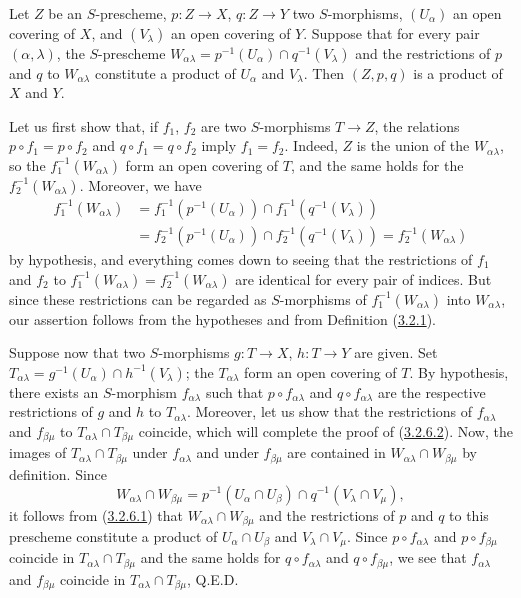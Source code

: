 \begin{lemma}[3.2.6.2]
\label{I.3.2.6.2}
Let $Z$ be an $S$-prescheme, $p:Z\to X$, $q:Z\to Y$ two $S$-morphisms,
$(U_\alpha)$ an open covering of $X$, and $(V_\lambda)$ an open covering
of $Y$. Suppose that for every pair $(\alpha,\lambda)$, the
$S$-prescheme
$W_{\alpha\lambda}=p^{-1}(U_\alpha)\cap q^{-1}(V_\lambda)$ and the
restrictions of $p$ and $q$ to $W_{\alpha\lambda}$ constitute a product of
$U_\alpha$ and $V_\lambda$. Then $(Z,p,q)$ is a product of $X$ and $Y$.
\end{lemma}

Let us first show that, if $f_1$, $f_2$ are two $S$-morphisms $T\to Z$, the
relations $p\circ f_1=p\circ f_2$ and $q\circ f_1=q\circ f_2$ imply
$f_1=f_2$. Indeed, $Z$ is the union of the $W_{\alpha\lambda}$, so the
$f_1^{-1}(W_{\alpha\lambda})$ form an open covering of $T$, and
the same holds for the $f_2^{-1}(W_{\alpha\lambda})$. Moreover, we have
\[
\begin{aligned}
  f_1^{-1}(W_{\alpha\lambda})
  &=f_1^{-1}(p^{-1}(U_\alpha))\cap
    f_1^{-1}(q^{-1}(V_\lambda)) \\
  &=f_2^{-1}(p^{-1}(U_\alpha))\cap
    f_2^{-1}(q^{-1}(V_\lambda))
   =f_2^{-1}(W_{\alpha\lambda})
\end{aligned}
\]
by hypothesis, and everything comes down to seeing that the restrictions of
$f_1$ and $f_2$ to $f_1^{-1}(W_{\alpha\lambda})=f_2^{-1}(W_{\alpha\lambda})$ are
identical for every pair of indices. But since these restrictions can be
regarded as $S$-morphisms of
$f_1^{-1}(W_{\alpha\lambda})$ into $W_{\alpha\lambda}$, our assertion
follows from the hypotheses and from Definition (\hyperref[I.3.2.1]{3.2.1}).

Suppose now that two $S$-morphisms $g:T\to X$, $h:T\to Y$ are given.
Set
$T_{\alpha\lambda}=g^{-1}(U_\alpha)\cap h^{-1}(V_\lambda)$; the
$T_{\alpha\lambda}$ form an open covering of $T$. By hypothesis,
there exists an $S$-morphism $f_{\alpha\lambda}$ such that
$p\circ f_{\alpha\lambda}$ and $q\circ f_{\alpha\lambda}$ are the
respective restrictions of $g$ and $h$ to $T_{\alpha\lambda}$. Moreover,
let us show that the restrictions of $f_{\alpha\lambda}$ and
$f_{\beta\mu}$ to
$T_{\alpha\lambda}\cap T_{\beta\mu}$ coincide, which will complete the
proof of (\hyperref[I.3.2.6.2]{3.2.6.2}). Now, the images of
$T_{\alpha\lambda}\cap T_{\beta\mu}$ under $f_{\alpha\lambda}$ and under
$f_{\beta\mu}$ are contained in
$W_{\alpha\lambda}\cap W_{\beta\mu}$ by definition. Since
\[
  W_{\alpha\lambda}\cap W_{\beta\mu}
  =p^{-1}(U_\alpha\cap U_\beta)\cap
   q^{-1}(V_\lambda\cap V_\mu),
\]
it follows from (\hyperref[I.3.2.6.1]{3.2.6.1}) that
$W_{\alpha\lambda}\cap W_{\beta\mu}$ and the restrictions of $p$ and $q$ to
this prescheme constitute a product of
$U_\alpha\cap U_\beta$ and $V_\lambda\cap V_\mu$. Since
$p\circ f_{\alpha\lambda}$ and $p\circ f_{\beta\mu}$ coincide in
$T_{\alpha\lambda}\cap T_{\beta\mu}$ and the same holds for
$q\circ f_{\alpha\lambda}$ and $q\circ f_{\beta\mu}$, we see that
$f_{\alpha\lambda}$ and $f_{\beta\mu}$ coincide in
$T_{\alpha\lambda}\cap T_{\beta\mu}$, Q.E.D.

